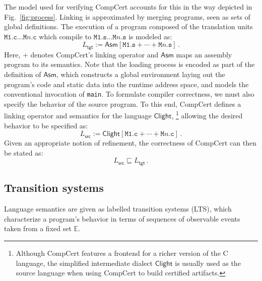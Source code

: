 \documentclass[11pt,oneside,draft]{book}
\theoremstyle{definition}
\newcommand{\kw}[1]{\ensuremath{ \mathsf{#1} }}
\newcommand{\refby}{\sqsubseteq} %
\begin{document}
The model used for verifying CompCert accounts for this
in the way depicted in Fig.~\ref{fig:process}.
Linking is approximated by
merging programs, seen as sets of global definitions.
The execution
of a program composed of the translation units
$\texttt{M1.c} \ldots \texttt{M$n$.c}$
which compile to
$\texttt{M1.s} \ldots \texttt{M$n$.s}$
is modeled as:
\[
    L_\kw{tgt} :=
    \kw{Asm}[\texttt{M1.s} +
             \cdots +
             \texttt{M$n$.s}] \,.
\]
Here,
$+$ denotes CompCert's linking operator and
$\kw{Asm}$ maps an assembly program to its semantics.
Note that the loading process is encoded
as part of the definition of $\kw{Asm}$,
which constructs a global environment
laying out the program's code and static data
into the runtime address space,
and models the conventional invocation of \texttt{main}.
To formulate compiler correctness,
we must also specify the behavior of the source program.
To this end,
CompCert defines a linking operator
and semantics
for the language $\kw{Clight}$,%
\footnote{
  Although CompCert features a frontend for a richer version
  of the C language,
  the simplified intermediate dialect \kw{Clight}
  is usually used as the source language
  when using CompCert to build certified artifacts.
}
allowing the desired behavior to be specified as:
\[
    L_\kw{src} :=
    \kw{Clight}[\texttt{M1.c} + \cdots + \texttt{M$n$.c}] \,.
\]
Given an appropriate notion of refinement,
the correctness of CompCert
can then be stated as:
\[
  L_\kw{src} \refby L_\kw{tgt}
  \,.
\]


\subsection{Transition systems} %

Language semantics are
given as labelled transition systems (LTS),
which characterize a program's behavior in terms of
sequences of observable events
taken from a fixed set $\mathbb{E}$.
\end{document}
